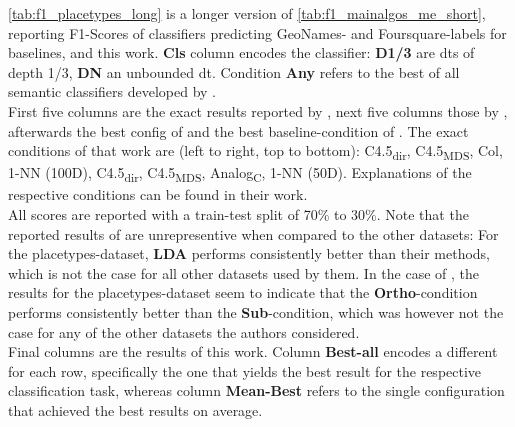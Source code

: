 \autoref{tab:f1_placetypes_long} is a longer version of \autoref{tab:f1_mainalgos_me_short}, reporting F1-Scores of classifiers predicting GeoNames- and Foursquare-labels for baselines, \mainalgos and this work. 
\textbf{Cls} column encodes the classifier: \textbf{D1/3} are \glspl{dt} of depth 1/3, \textbf{DN} an unbounded \gls{dt}. Condition \textbf{Any} refers to the best of all semantic classifiers developed by \cite{Derrac2015}. \\
First five columns are the exact results reported by \cite{Alshaikh2020}, next five columns those by \cite{Ager2018}, afterwards the best config of \cite{Derrac2015} and the best baseline-condition of \cite{Derrac2015}. The exact conditions of that work are (left to right, top to bottom): C4.5\textsubscript{dir}, C4.5\textsubscript{MDS}, Col, 1-NN (100D), C4.5\textsubscript{dir}, C4.5\textsubscript{MDS}, Analog\textsubscript{C}, 1-NN (50D). Explanations of the respective conditions can be found in their work. \\
All scores are reported with a train-test split of 70\% to 30\%. Note that the reported results of \cite{Ager2018} are unrepresentive when compared to the other datasets: For the placetypes-dataset, \textbf{LDA} performs consistently better than their methods, which is not the case for all other datasets used by them. In the case of \cite{Alshaikh2020}, the results for the placetypes-dataset seem to indicate that the \textbf{Ortho}-condition performs consistently better than the \textbf{Sub}-condition, which was however not the case for any of the other datasets the authors considered. \\
Final columns are the results of this work. Column \textbf{Best-all} encodes a different for each row, specifically the one that yields the best result for the respective classification task, whereas column \textbf{Mean-Best} refers to the single configuration that achieved the best results on average.